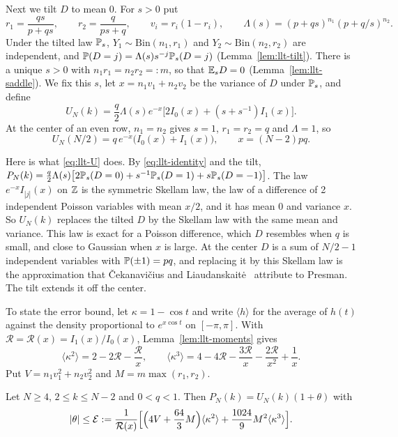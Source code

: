 Next we tilt $D$ to mean $0$. For $s>0$ put
\[
r_1=\frac{qs}{p+qs},\qquad r_2=\frac q{ps+q},\qquad v_i=r_i(1-r_i),\qquad
\Lambda(s)=(p+qs)^{n_1}(p+q/s)^{n_2}.
\]
Under the tilted law $\mathbb{P}_s$, $Y_1\sim\mathrm{Bin}(n_1,r_1)$ and
$Y_2\sim\mathrm{Bin}(n_2,r_2)$ are independent, and
$\mathbb{P}(D=j)=\Lambda(s)s^{-j}\mathbb{P}_s(D=j)$ (Lemma~\ref{lem:llt-tilt}). There is
a unique $s>0$ with $n_1r_1=n_2r_2=:m$, so that $\mathbb{E}_sD=0$
(Lemma~\ref{lem:llt-saddle}). We fix this $s$, let $x=n_1v_1+n_2v_2$ be the
variance of $D$ under $\mathbb{P}_s$, and define
\begin{equation}\label{eq:llt-U}
U_N(k)=\frac q2\Lambda(s)e^{-x}\bigl[2I_0(x)+(s+s^{-1})I_1(x)\bigr].
\end{equation}
At the center of an even row, $n_1=n_2$ gives $s=1$, $r_1=r_2=q$ and
$\Lambda=1$, so
\begin{equation}\label{eq:llt-center}
U_N(N/2)=q\,e^{-x}\bigl(I_0(x)+I_1(x)\bigr),\qquad x=(N-2)pq.
\end{equation}

Here is what \eqref{eq:llt-U} does. By \eqref{eq:llt-identity} and the tilt,
$P_N(k)=\frac q2\Lambda(s)\bigl[2\mathbb{P}_s(D=0)+s^{-1}\mathbb{P}_s(D=1)+s\mathbb{P}_s(D=-1)\bigr]$.
The law $e^{-x}I_{|j|}(x)$ on $\mathbb{Z}$ is the symmetric Skellam law, the law of a
difference of 2 independent Poisson variables with mean $x/2$, and it has mean
$0$ and variance $x$. So $U_N(k)$ replaces the tilted $D$ by the Skellam law
with the same mean and variance. This law is exact for a Poisson difference,
which $D$ resembles when $q$ is small, and close to Gaussian when $x$ is large.
At the center $D$ is a sum of $N/2-1$ independent variables with
$\mathbb{P}(\pm1)=pq$, and replacing it by this Skellam law is the approximation
that \v{C}ekanavi\v{c}ius and Liaudanskait\.{e}~\cite[Eq.~(3)]{cekanavicius2024}
attribute to Presman. The tilt extends it off the center.

To state the error bound, let $\kappa=1-\cos t$ and write $\langle h\rangle$
for the average of $h(t)$ against the density proportional to $e^{x\cos t}$ on
$[-\pi,\pi]$. With $\mathcal R=\mathcal R(x)=I_1(x)/I_0(x)$,
Lemma~\ref{lem:llt-moments} gives
\[
\langle\kappa^2\rangle=2-2\mathcal R-\frac{\mathcal R}x,\qquad
\langle\kappa^3\rangle=4-4\mathcal R-\frac{3\mathcal R}x-\frac{2\mathcal R}{x^2}+\frac1x.
\]
Put $V=n_1v_1^2+n_2v_2^2$ and $M=m\max(r_1,r_2)$.

\begin{theorem}\label{thm:llt}
Let $N\ge4$, $2\le k\le N-2$ and $0<q<1$. Then $P_N(k)=U_N(k)(1+\theta)$ with
\[
|\theta|\le\mathcal E:=\frac1{\mathcal R(x)}\Bigl[\Bigl(4V+\frac{64}3M\Bigr)\langle\kappa^2\rangle
+\frac{1024}9M^2\langle\kappa^3\rangle\Bigr].
\]
\end{theorem}

